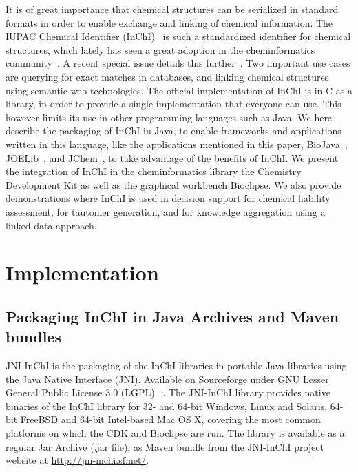 \documentclass[10pt]{bmc_article}
\newenvironment{bmcformat}{\fussy\setboolean{publ}{true}}{\fussy}
\begin{document}
\begin{bmcformat}
It is of great importance that chemical structures can be serialized in standard formats in order to enable exchange and linking of chemical information. The IUPAC Chemical Identifier (InChI)~\cite{Stein2003} is such a standardized identifier for chemical structures, which lately has seen a great adoption in the cheminformatics community~\cite{OBoyle:2011fk}. A recent special issue details this further~\cite{Williams2012}. Two important use cases are querying for exact matches in databases, and linking chemical structures using semantic web technologies. The official implementation of InChI is in C as a library, in order to provide a single implementation that everyone can use. This however limits its use in other programming languages such as Java. We here describe the packaging of InChI in Java, to enable frameworks and applications written in this language, like the applications mentioned in this paper, BioJava~\cite{BioJava}, JOELib~\cite{Wegner2006}, and JChem~\cite{ChemAxon}, to take advantage of the benefits of InChI. We present the integration of InChI in the cheminformatics library the Chemistry Development Kit as well as the graphical workbench Bioclipse. We also provide demonstrations where InChI is used in decision support for chemical liability assessment, for tautomer generation, and for knowledge aggregation using a linked data approach.
 




\section*{Implementation}

\subsection*{Packaging InChI in Java Archives and Maven bundles}

JNI-InChI is the packaging of the InChI libraries in portable Java libraries using the Java Native Interface (JNI).
Available on Sourceforge under GNU Lesser General Public License 3.0 (LGPL) ~\cite{JNIINCHIURL}.
The JNI-InChI library provides native binaries of the InChI library for 32- and 64-bit Windows, Linux and Solaris,
64-bit FreeBSD and 64-bit Intel-based Mac OS X, covering the most common platforms on which the CDK and Bioclipse are run.
The library is available as a regular Jar Archive (.jar file), as Maven bundle from the JNI-InChI project website
at \url{http://jni-inchi.sf.net/}.


\end{bmcformat}
\end{document}
